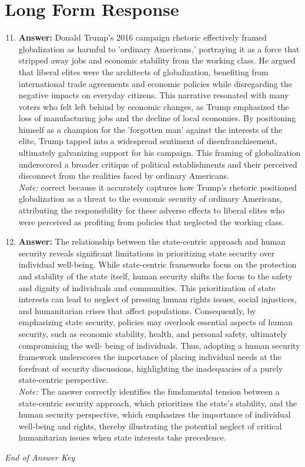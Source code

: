 \documentclass[12pt]{article}
\begin{document}
\section*{Long Form Response}
\begin{enumerate}[label=\arabic*.]
\setcounter{enumi}{10}
\item \textbf{Answer:} Donald Trump's 2016 campaign rhetoric effectively framed globalization as harmful to 'ordinary Americans,' portraying it as a force that stripped away jobs and economic stability from the working class. He argued that liberal elites were the architects of globalization, benefiting from international trade agreements and economic policies while disregarding the negative impacts on everyday citizens. This narrative resonated with many voters who felt left behind by economic changes, as Trump emphasized the loss of manufacturing jobs and the decline of local economies. By positioning himself as a champion for the 'forgotten man' against the interests of the elite, Trump tapped into a widespread sentiment of disenfranchisement, ultimately galvanizing support for his campaign. This framing of globalization underscored a broader critique of political establishments and their perceived disconnect from the realities faced by ordinary Americans.
\\ \textit{Note:} correct because it accurately captures how Trump's rhetoric positioned globalization as a threat to the economic security of ordinary Americans, attributing the responsibility for these adverse effects to liberal elites who were perceived as profiting from policies that neglected the working class.
\item \textbf{Answer:} The relationship between the state-centric approach and human security reveals significant limitations in prioritizing state security over individual well-being. While state-centric frameworks focus on the protection and stability of the state itself, human security shifts the focus to the safety and dignity of individuals and communities. This prioritization of state interests can lead to neglect of pressing human rights issues, social injustices, and humanitarian crises that affect populations. Consequently, by emphasizing state security, policies may overlook essential aspects of human security, such as economic stability, health, and personal safety, ultimately compromising the well- being of individuals. Thus, adopting a human security framework underscores the importance of placing individual needs at the forefront of security discussions, highlighting the inadequacies of a purely state-centric perspective.
\\ \textit{Note:} The answer correctly identifies the fundamental tension between a state-centric security approach, which prioritizes the state's stability, and the human security perspective, which emphasizes the importance of individual well-being and rights, thereby illustrating the potential neglect of critical humanitarian issues when state interests take precedence.
\end{enumerate}

\vfill
\noindent\textit{End of Answer Key}
\end{document}
